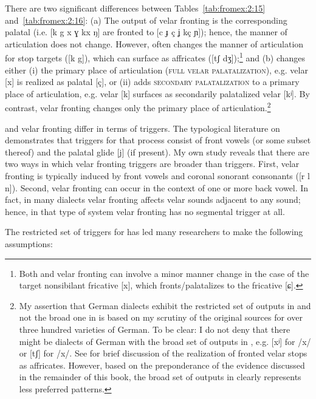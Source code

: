 \begin{xlist}
\begin{xlist}
There are two  significant differences between Tables~\ref{tab:fromex:2:15} and~\ref{tab:fromex:2:16}: (a) The output of velar fronting is the corresponding palatal (i.e. [k g x ɣ kx ŋ] are fronted to [c ɟ ç ʝ kç ɲ]); hence, the manner of articulation does not change. However,  often changes the manner of articulation for stop targets ([k g]), which can surface as affricates ([tʃ dʒ]);\footnote{Both  and velar fronting can involve a minor manner change in the case of the target nonsibilant fricative [x], which fronts/palatalizes to the  fricative [ɕ].} and (b)  changes either (i) the primary place of articulation (\textsc{full} \textsc{velar} \textsc{palatalization}), e.g. velar [x] is realized as palatal [ç], or (ii) adds \textsc{secondary palatalization} to a primary place of articulation, e.g. velar [k] surfaces as secondarily palatalized velar [kʲ]. By contrast, velar fronting changes only the primary place of articulation.\footnote{My assertion that German dialects exhibit the restricted set of outputs in  and not the broad one in  is based on my scrutiny of the original sources for over three hundred varieties of German. To be clear: I do not deny that there might be dialects of German with the broad set of outputs in , e.g. [xʲ] for /x/ or [tʃ] for /x/. See  for brief discussion of the realization of fronted velar stops as affricates. However, based on the preponderance of the evidence discussed in the remainder of this book, the broad set of outputs in  clearly represents less preferred patterns.}

 and velar fronting differ in terms of triggers. The typological literature on  demonstrates that triggers for that process consist of front vowels (or some subset thereof) and the palatal glide [j] (if present). My own study reveals that there are two ways in which velar fronting triggers are broader than  triggers. First, velar fronting is typically induced by front vowels and coronal sonorant consonants ([r l n]). Second, velar fronting can occur in the context of one or more back vowel. In fact, in many dialects velar fronting affects velar sounds adjacent to any sound; hence, in that type of system velar fronting has no segmental trigger at all.

The restricted set of triggers for  has led many researchers to make the following assumptions:\largerpage


\end{xlist}
\end{xlist}
